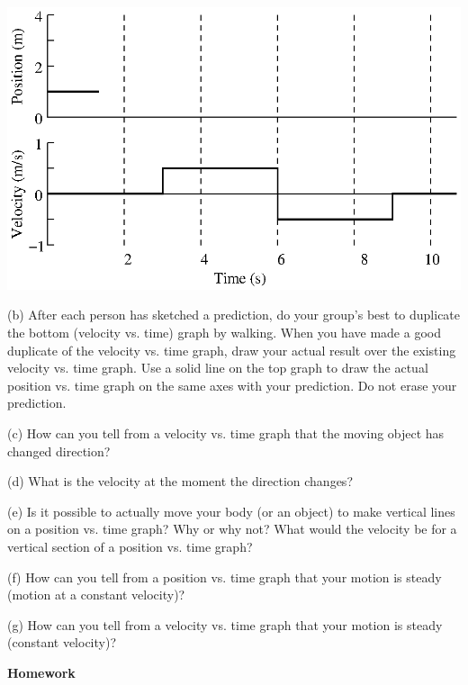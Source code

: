 \vspace{0.3cm}
{\par\centering \includegraphics{relating_fig2.eps} \par}
\vspace{0.3cm}

(b) After each person has sketched a prediction, do your group's best to duplicate the bottom (velocity vs. time) graph by walking. When you have made a good duplicate of the velocity vs. time graph, draw your actual result over the existing velocity vs. time graph. Use a solid line on the top graph to draw the actual position vs. time graph on the same axes with your prediction. Do not erase your prediction.

(c) How can you tell from a velocity vs. time graph that the moving object has
changed direction?
\vspace{10mm}

(d) What is the velocity at the moment the direction changes? 
\vspace{10mm}

(e) Is it possible to actually move your body (or an object) to make vertical
lines on a position vs. time graph? Why or why not? What would the velocity
be for a vertical section of a position vs. time graph? 
\vspace{10mm}

(f) How can you tell from a position vs. time graph that your motion is steady
(motion at a constant velocity)? 
\vspace{10mm}

(g) How can you tell from a velocity vs. time graph that your motion is steady
(constant velocity)? 
\vspace{10mm}

\textbf{Homework} 


